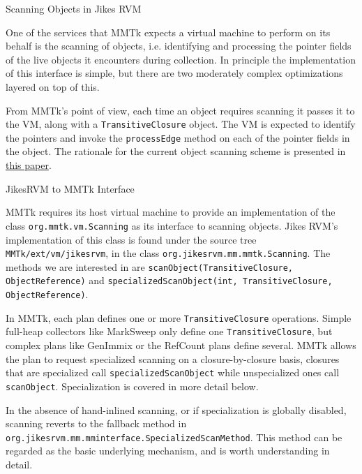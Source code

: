 \begin{section}{Scanning Objects in Jikes RVM}
\label{sec:scanningobjectsinjikesrvm}

One of the services that MMTk expects a virtual machine to perform on its behalf is the scanning of objects, i.e. identifying and processing the pointer fields of the live objects it encounters during collection. In principle the implementation of this interface is simple, but there are two moderately complex optimizations layered on top of this.

From MMTk's point of view, each time an object requires scanning it passes it to the VM, along with a \texttt{TransitiveClosure} object. The VM is expected to identify the pointers and invoke the \texttt{processEdge} method on each of the pointer fields in the object.  The rationale for the current object scanning scheme is presented in \href{http://portal.acm.org/citation.cfm?id=1993484}{this paper}.

\begin{subsection}{JikesRVM to MMTk Interface}

MMTk requires its host virtual machine to provide an implementation of the class \texttt{org.mmtk.vm.Scan\-ning} as its interface to scanning objects.  Jikes RVM's implementation of this class is found under the source tree \texttt{MMTk/ext/vm/jikes\-rvm}, in the class \texttt{org.jikes\-rvm.mm.mmtk.Scan\-ning}.  The methods we are interested in are \texttt{scan\-Ob\-ject(Tran\-si\-ti\-ve\-Clo\-su\-re, Ob\-ject\-Re\-fer\-ence)} and \texttt{spe\-cial\-iz\-ed\-Scan\-Ob\-ject(int, Tran\-si\-ti\-ve\-Clo\-su\-re, Ob\-ject\-Re\-fer\-en\-ce)}.

In MMTk, each plan defines one or more \texttt{TransitiveClosure} operations.  Simple full-heap collectors like MarkSweep only define one \texttt{TransitiveClosure}, but complex plans like GenImmix or the RefCount plans define several.  MMTk allows the plan to request specialized scanning on a closure-by-closure basis, closures that are specialized call \texttt{specializedScanObject} while unspecialized ones call \texttt{scanObject}.  Specialization is covered in more detail below.

In the absence of hand-inlined scanning, or if specialization is globally disabled, scanning reverts to the fallback method in \texttt{org.jikes\-rvm.mm.mm\-in\-ter\-fa\-ce.Spe\-cial\-iz\-ed\-Scan\-Me\-thod}.  This method can be regarded as the basic underlying mechanism, and is worth understanding in detail.


\end{subsection}
\end{section}
